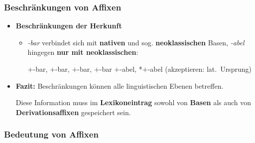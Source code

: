 \begin{frame}
\frametitle{Beschränkungen von Affixen}

\begin{itemize}

\item \textbf{Beschränkungen der Herkunft}

\begin{itemize}
\item \emph{-bar} verbindet sich mit \textbf{nativen} und sog. \textbf{neoklassischen} Basen, \emph{-abel} hingegen \textbf{nur mit neoklassischen}: 

\ea 
\ea {}$+$-bar, $+$-bar, $+$-bar, $+$-bar 
\ex {}$+$-abel, *$+$-abel (akzeptieren: lat.\ Ursprung)
\z 
\z

\end{itemize}

\pause 

\item \textbf{Fazit:} Beschränkungen können alle linguistischen Ebenen betreffen. 

Diese Information muss im \textbf{Lexikoneintrag} sowohl von \textbf{Basen} als auch von \textbf{Derivationsaffixen} gespeichert sein.	
\end{itemize}

\end{frame}


\subsubsection{Bedeutung von Affixen}

